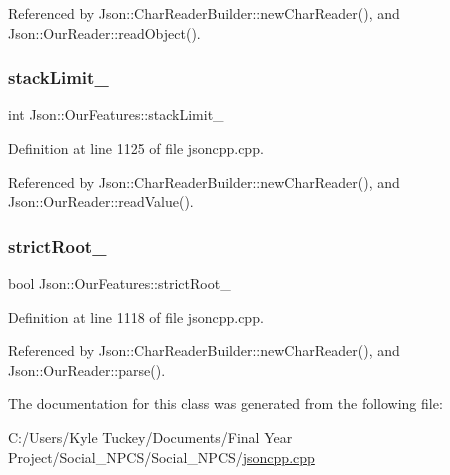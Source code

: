 Referenced by Json\+::\+Char\+Reader\+Builder\+::new\+Char\+Reader(), and Json\+::\+Our\+Reader\+::read\+Object().

\mbox{\label{class_json_1_1_our_features_a9a786713902d14be6d57a08cc03ccfff}} 
\subsubsection{\texorpdfstring{stack\+Limit\+\_\+}{stackLimit\_}}
{\footnotesize\ttfamily int Json\+::\+Our\+Features\+::stack\+Limit\+\_\+}



Definition at line 1125 of file jsoncpp.\+cpp.



Referenced by Json\+::\+Char\+Reader\+Builder\+::new\+Char\+Reader(), and Json\+::\+Our\+Reader\+::read\+Value().

\mbox{\label{class_json_1_1_our_features_a2095f66a776c0a4ae6cc931a0c94242e}} 
\subsubsection{\texorpdfstring{strict\+Root\+\_\+}{strictRoot\_}}
{\footnotesize\ttfamily bool Json\+::\+Our\+Features\+::strict\+Root\+\_\+}



Definition at line 1118 of file jsoncpp.\+cpp.



Referenced by Json\+::\+Char\+Reader\+Builder\+::new\+Char\+Reader(), and Json\+::\+Our\+Reader\+::parse().



The documentation for this class was generated from the following file\+:\begin{DoxyCompactItemize}
\item 
C\+:/\+Users/\+Kyle Tuckey/\+Documents/\+Final Year Project/\+Social\+\_\+\+N\+P\+C\+S/\+Social\+\_\+\+N\+P\+C\+S/\hyperlink{jsoncpp_8cpp}{jsoncpp.\+cpp}\end{DoxyCompactItemize}
